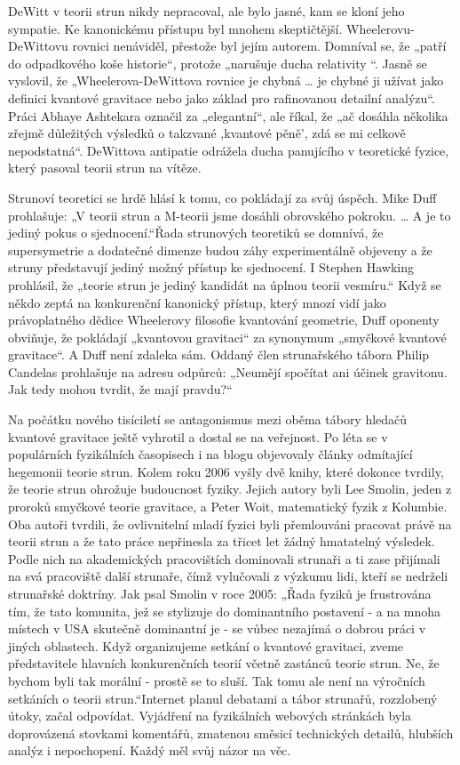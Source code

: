   DeWitt v teorii strun nikdy nepracoval, ale bylo jasné, kam se kloní jeho sympatie. Ke kanonickému
  přístupu byl mnohem skeptičtější. Wheelerovu-DeWittovu rovnici nenáviděl, přestože byl jejím
  autorem. Domníval se, že „patří do odpadkového koše historie“, protože „narušuje ducha relativity
  “. Jasně se vyslovil, že „Wheelerova-DeWittova rovnice je chybná … je chybné ji užívat jako
  definici kvantové gravitace nebo jako základ pro rafinovanou detailní analýzu“. Práci Abhaye
  Ashtekara označil za „elegantní“, ale říkal, že „ač dosáhla několika zřejmě důležitých výsledků o
  takzvané ,kvantové pěně', zdá se mi celkově nepodstatná“. DeWittova antipatie odrážela ducha
  panujícího v teoretické fyzice, který pasoval teorii strun na vítěze. 
  
  Strunoví teoretici se hrdě hlásí k tomu, co pokládají za svůj úspěch. Mike Duff prohlašuje: „V
  teorii strun a M-teorii jsme dosáhli obrovského pokroku. … A je to jediný pokus o sjednocení.“Řada
  strunových teoretiků se domnívá, že supersymetrie a dodatečné dimenze budou záhy experimentálně
  objeveny a že struny představují jediný možný přístup ke sjednocení. I Stephen Hawking prohlásil,
  že „teorie strun je jediný kandidát na úplnou teorii vesmíru.“ Když se někdo zeptá na konkurenční
  kanonický přístup, který mnozí vidí jako právoplatného dědice Wheelerovy filosofie kvantování
  geometrie, Duff oponenty obviňuje, že pokládají „kvantovou gravitaci“ za synonymum „smyčkové
  kvantové gravitace“. A Duff není zdaleka sám. Oddaný člen strunařského tábora Philip Candelas
  prohlašuje na adresu odpůrců: „Neumějí spočítat ani účinek gravitonu. Jak tedy mohou tvrdit, že
  mají pravdu?“
  
  Na počátku nového tisíciletí se antagonismus mezi oběma tábory hledačů kvantové gravitace ještě
  vyhrotil a dostal se na veřejnost. Po léta se v populárních fyzikálních časopisech i na blogu
  objevovaly články odmítající hegemonii teorie strun. Kolem roku 2006 vyšly dvě knihy, které
  dokonce tvrdily, že teorie strun ohrožuje budoucnost fyziky. Jejich autory byli Lee Smolin, jeden
  z proroků smyčkové teorie gravitace, a Peter Woit, matematický fyzik z Kolumbie. Oba autoři
  tvrdili, že ovlivnitelní mladí fyzici byli přemlouváni pracovat právě na teorii strun a že tato
  práce nepřinesla za třicet let žádný hmatatelný výsledek. Podle nich na akademických pracovištích
  dominovali strunaři a ti zase přijímali na svá pracoviště další strunaře, čímž vylučovali z
  výzkumu lidi, kteří se nedrželi strunařské doktríny. Jak psal Smolin v roce 2005: „Řada fyziků je
  frustrována tím, že tato komunita, jež se stylizuje do dominantního postavení - a na mnoha místech
  v USA skutečně dominantní je - se vůbec nezajímá o dobrou práci v jiných oblastech. Když
  organizujeme setkání o kvantové gravitaci, zveme představitele hlavních konkurenčních teorií
  včetně zastánců teorie strun. Ne, že bychom byli tak morální - prostě se to sluší. Tak tomu ale
  není na výročních setkáních o teorii strun.“Internet planul debatami a tábor strunařů, rozzlobený
  útoky, začal odpovídat. Vyjádření na fyzikálních webových stránkách byla doprovázená stovkami
  komentářů, zmatenou směsicí technických detailů, hlubších analýz i nepochopení. Každý měl svůj
  názor na věc. 
  
